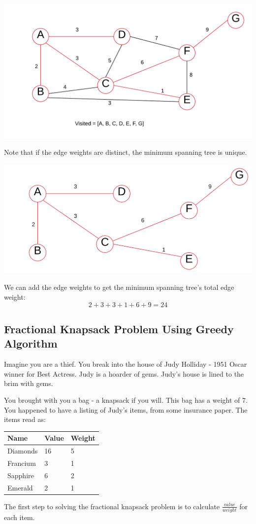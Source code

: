\documentclass{article}
\begin{document}
\includegraphics[width=\textwidth,height=\textheight,keepaspectratio]{withD3.png}

Note that if the edge weights are distinct, the minimum spanning tree is unique.

\includegraphics[width=\textwidth,height=\textheight,keepaspectratio]{10.png}

We can add the edge weights to get the minimum spanning tree's total edge weight:
$$2 + 3 + 3 + 1 + 6 + 9 = 24$$
\newpage
\subsection{Fractional Knapsack Problem Using Greedy Algorithm}
Imagine you are a thief. You break into the house of Judy Holliday - 1951 Oscar winner for Best Actress. Judy is a hoarder of gems. Judy's house is lined to the brim with gems.

You brought with you a bag - a knapsack if you will. This bag has a weight of 7. You happened to have a listing of  Judy's items, from some insurance paper. The items read as:

\begin{center}
\begin{tabular}{|l|l|l|}
\hline
\centering
\textbf{Name} & \textbf{Value} & \textbf{Weight} \\ \hline
Diamonds      & 16             & 5               \\ \hline
Francium      & 3              & 1               \\ \hline
Sapphire      & 6              & 2               \\ \hline
Emerald       & 2              & 1               \\ \hline
\end{tabular}
\end{center}
The first step to solving the fractional knapsack problem is to calculate $\frac{value}{weight}$ for each item.
\end{document}
